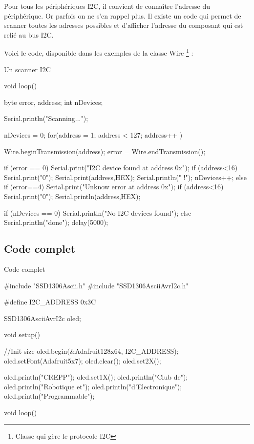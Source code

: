 Pour tous les périphériques I2C, il convient de connaître l'adresse du périphérique. Or parfois on ne s'en rappel plus.
Il existe un code qui permet de scanner toutes les adresses possibles et d'afficher l'adresse du composant qui est relié au bus I2C.

Voici le code, disponible dans les exemples de la classe Wire \footnote{Classe qui gère le protocole I2C} : 

\begin{Cpp}{Un scanner I2C}

void loop()
{
  byte error, address;
  int nDevices;
     
  Serial.println("Scanning...");
     
  nDevices = 0;
  for(address = 1; address < 127; address++ )
  {
    Wire.beginTransmission(address);
    error = Wire.endTransmission();
     
    if (error == 0)
    {
      Serial.print("I2C device found at address 0x");
      if (address<16) {
        Serial.print("0");
      }
      Serial.print(address,HEX);
      Serial.println("  !");
      nDevices++;
    }
    else if (error==4)
    {
      Serial.print("Unknow error at address 0x");
      if (address<16) {
        Serial.print("0");
      } 
      Serial.println(address,HEX);
    }    
  }
  if (nDevices == 0) {
    Serial.println("No I2C devices found\n");
  }
  else {
    Serial.println("done\n");
  }
  delay(5000);         
    
}
\end{Cpp}


\subsection{Code complet}

\begin{Cpp}{Code complet}

  #include "SSD1306Ascii.h"
  #include "SSD1306AsciiAvrI2c.h"
   
  #define I2C_ADDRESS 0x3C
   
  SSD1306AsciiAvrI2c oled;
   
  void setup() {
  
    //Init size
    oled.begin(&Adafruit128x64, I2C_ADDRESS);
    oled.setFont(Adafruit5x7);  
    oled.clear();
    oled.set2X();
  
    
    oled.println("CREPP");
    oled.set1X();
    oled.println("Club de");
    oled.println("Robotique et");
    oled.println("d'Electronique");
    oled.println("Programmable");
   
  }
  void loop() {
   
  }
\end{Cpp}

